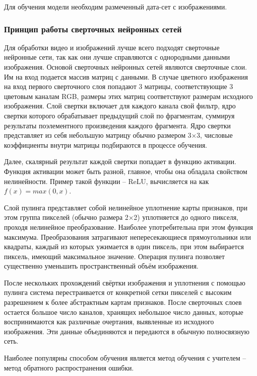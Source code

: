 \documentclass[a4paper,14pt]{article}
\begin{document}
Для обучения модели необходим размеченный дата-сет с изображениями.

\subsubsection{Принцип работы сверточных нейронных сетей}

Для обработки видео и изображений лучше всего подходят сверточные нейронные сети, так как они лучше справляются с однородными данными изображения.
Основой сверточных нейронных сетей являются сверточные слои.
Им на вход подается массив матриц с данными.
В случае цветного изображения на вход первого сверточного слоя попадают 3 матрицы, соответствующие 3 цветовым каналам RGB, размеры этих матриц соответствуют размерам исходного изображения.
Слой свертки включает для каждого канала свой фильтр, ядро свертки которого обрабатывает предыдущий слой по фрагментам, суммируя результаты поэлементного произведения каждого фрагмента.
Ядро свертки представляет из себя небольшую матрицу обычно размером 3×3, числовые коэффициенты внутри матрицы подбираются в процессе обучения. 

Далее, скалярный результат каждой свертки попадает в функцию активации.
Функция активации может быть разной, главное, чтобы она обладала свойством нелинейности.
Пример такой функции -- ReLU, вычисляется на как $f(x) = max(0,x)$.

Слой пулинга представляет собой нелинейное уплотнение карты признаков, при этом группа пикселей (обычно размера 2×2) уплотняется до одного пикселя, проходя нелинейное преобразование.
Наиболее употребительна при этом функция максимума.
Преобразования затрагивают непересекающиеся прямоугольники или квадраты, каждый из которых ужимается в один пиксель, при этом выбирается пиксель, имеющий максимальное значение.
Операция пулинга позволяет существенно уменьшить пространственный объём изображения. 

После нескольких прохождений свёртки изображения и уплотнения с помощью пулинга система перестраивается от конкретной сетки пикселей с высоким разрешением к более абстрактным картам признаков.
После сверточных слоев остается большое число каналов, хранящих небольшое число данных, которые воспринимаются как различные очертания, выявленные из исходного изображения.
Эти данные объединяются и передаются в обычную полносвязную сеть.

Наиболее популярны способом обучения является метод обучения с учителем -- метод обратного распространения ошибки.
\end{document}
